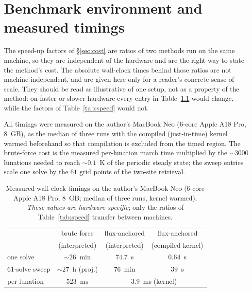 \documentclass[11pt,a4paper,oneside]{report}
\begin{document}
\chapter{Benchmark environment and measured timings}\label{app:timings}

The speed-up factors of \S\ref{sec:cost} are ratios of two methods run
on the same machine, so they are independent of the hardware and are
the right way to state the method's cost. The absolute wall-clock
times behind those ratios are not machine-independent, and are given
here only for a reader's concrete sense of scale. They should be read
as illustrative of one setup, not as a property of the method: on
faster or slower hardware every entry in Table~\ref{tab:timings} would
change, while the factors of Table~\ref{tab:speed} would not.

All timings were measured on the author's MacBook Neo (6-core Apple
A18 Pro, 8~GB), as the median of three runs with the compiled
(just-in-time) kernel warmed beforehand so that compilation is
excluded from the timed region. The
brute-force cost is the measured per-lunation march time multiplied by
the ${\sim}3000$ lunations needed to reach ${\sim}0.1$~K of the
periodic steady state; the sweep entries scale one solve by the
$61$ grid points of the two-site retrieval.

\begin{table}[htbp]
  \centering\small
  \caption[Measured wall-clock timings]{Measured wall-clock timings on
  the author's MacBook Neo (6-core Apple A18 Pro, 8~GB; median of three
  runs, kernel warmed). \emph{These values are hardware-specific}; only
  the ratios of Table~\ref{tab:speed} transfer between machines.}
  \label{tab:timings}
  \begin{tabular}{lccc}
    \toprule
    & brute force & flux-anchored & flux-anchored \\
    & (interpreted) & (interpreted) & (compiled kernel) \\
    \midrule
    one solve         & ${\sim}26$~min & $74.7$~s & $0.64$~s \\
    61-solve sweep    & ${\sim}27$~h (proj.) & $76$~min & $39$~s \\
    per lunation      & $523$~ms & \multicolumn{2}{c}{$3.9$~ms (kernel)} \\
    \bottomrule
  \end{tabular}
\end{table}
\end{document}
